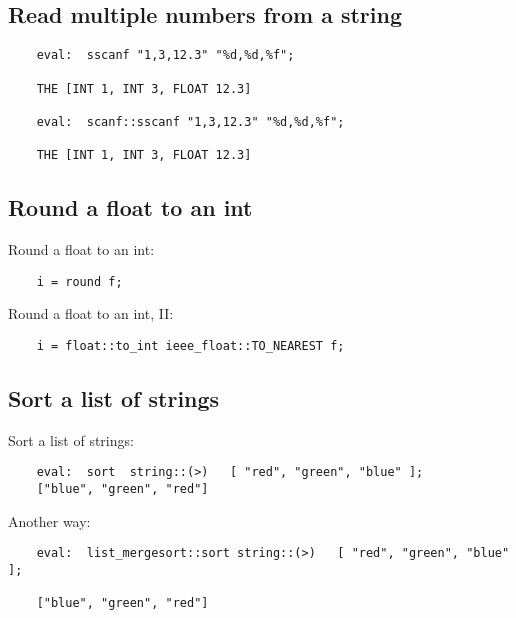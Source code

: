 \cutend*

\subsection{Read multiple numbers from a string}

\begin{verbatim}
    eval:  sscanf "1,3,12.3" "%d,%d,%f";

    THE [INT 1, INT 3, FLOAT 12.3]

    eval:  scanf::sscanf "1,3,12.3" "%d,%d,%f";

    THE [INT 1, INT 3, FLOAT 12.3]
\end{verbatim}

\cutend*

\subsection{Round a float to an int}

Round a float to an int: 
\begin{verbatim}
    i = round f;
\end{verbatim}

Round a float to an int, II:
\begin{verbatim}
    i = float::to_int ieee_float::TO_NEAREST f;
\end{verbatim}

\cutend*

\subsection{Sort a list of strings}

Sort a list of strings:
\begin{verbatim}
    eval:  sort  string::(>)   [ "red", "green", "blue" ];
    ["blue", "green", "red"]                     
\end{verbatim}

Another way:
\begin{verbatim}
    eval:  list_mergesort::sort string::(>)   [ "red", "green", "blue" ];

    ["blue", "green", "red"]
\end{verbatim}


